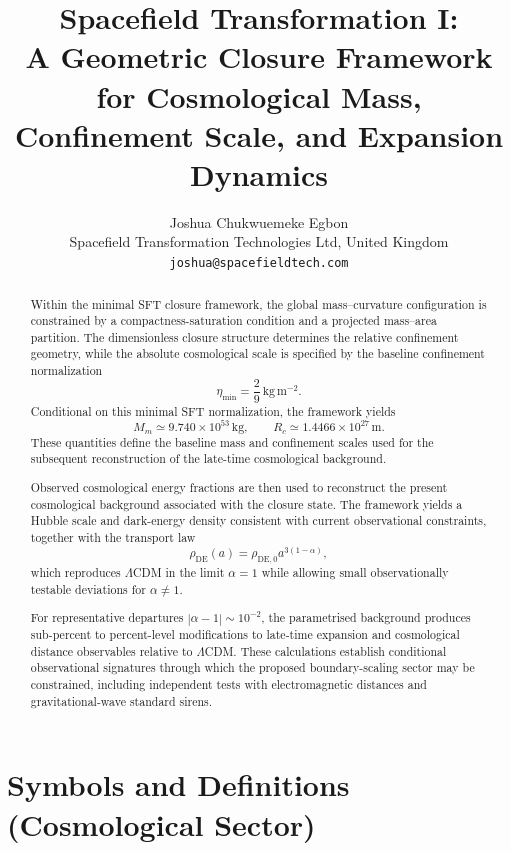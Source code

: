 \documentclass[12pt]{article}
\title{
\textbf{Spacefield Transformation I:}\\
\textbf{A Geometric Closure Framework for Cosmological Mass,}\\
\textbf{Confinement Scale, and Expansion Dynamics}
}
\author{
Joshua Chukwuemeke Egbon\\
\small Spacefield Transformation Technologies Ltd, United Kingdom\\
\small \texttt{joshua@spacefieldtech.com}
}
\date{}
\begin{document}
\maketitle

\begin{abstract}

Within the minimal SFT closure framework, the global mass--curvature
configuration is constrained by a compactness-saturation condition and
a projected mass--area partition. The dimensionless closure structure
determines the relative confinement geometry, while the absolute
cosmological scale is specified by the baseline confinement
normalization
\[
\eta_{\min}
=
\frac{2}{9}\,\mathrm{kg\,m^{-2}}.
\]
Conditional on this minimal SFT normalization, the framework yields
\[
M_m\simeq9.740\times10^{53}\,\mathrm{kg},
\qquad
R_c\simeq1.4466\times10^{27}\,\mathrm{m}.
\]
These quantities define the baseline mass and confinement scales used
for the subsequent reconstruction of the late-time cosmological
background.

Observed cosmological energy fractions are then used to reconstruct the
present cosmological background associated with the closure state. The
framework yields a Hubble scale and dark-energy density consistent with
current observational constraints, together with the transport law
\[
\rho_{\mathrm{DE}}(a)
=
\rho_{\mathrm{DE},0}a^{3(1-\alpha)},
\]
which reproduces $\Lambda$CDM in the limit $\alpha=1$ while allowing
small observationally testable deviations for $\alpha\neq1$.

For representative departures $|\alpha-1|\sim10^{-2}$, the
parametrised background produces sub-percent to percent-level
modifications to late-time expansion and cosmological distance
observables relative to $\Lambda$CDM. These calculations establish
conditional observational signatures through which the proposed
boundary-scaling sector may be constrained, including independent
tests with electromagnetic distances and gravitational-wave standard
sirens.

\end{abstract}


\section*{Symbols and Definitions (Cosmological Sector)}
\end{document}
